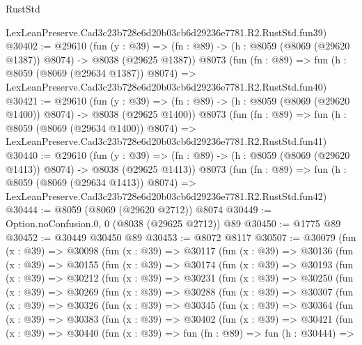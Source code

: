 \begin{lexlean}{RustStd}
\begin{coremodule}
    LexLeanPreserve.Cad3c23b728e6d20b03cb6d29236e7781.R2.RustStd.fun39)
@30402 := @29610
    (fun (y : @39) =>
    (fn : @89) -> (h : @8059 (@8069 (@29620 @1387)) @8074) -> @8038 (@29625 @1387))
    @8073
    (fun (fn : @89) =>
    fun (h : @8059 (@8069 (@29634 @1387)) @8074) =>
    LexLeanPreserve.Cad3c23b728e6d20b03cb6d29236e7781.R2.RustStd.fun40)
@30421 := @29610
    (fun (y : @39) =>
    (fn : @89) -> (h : @8059 (@8069 (@29620 @1400)) @8074) -> @8038 (@29625 @1400))
    @8073
    (fun (fn : @89) =>
    fun (h : @8059 (@8069 (@29634 @1400)) @8074) =>
    LexLeanPreserve.Cad3c23b728e6d20b03cb6d29236e7781.R2.RustStd.fun41)
@30440 := @29610
    (fun (y : @39) =>
    (fn : @89) -> (h : @8059 (@8069 (@29620 @1413)) @8074) -> @8038 (@29625 @1413))
    @8073
    (fun (fn : @89) =>
    fun (h : @8059 (@8069 (@29634 @1413)) @8074) =>
    LexLeanPreserve.Cad3c23b728e6d20b03cb6d29236e7781.R2.RustStd.fun42)
@30444 := @8059 (@8069 (@29620 @2712)) @8074
@30449 := Option.noConfusion.{0, 0} (@8038 (@29625 @2712)) @89
@30450 := @1775 @89
@30452 := @30449 @30450 @89
@30453 := @8072 @8117
@30507 := @30079
    (fun (x : @39) =>
    @30098
      (fun (x : @39) =>
      @30117
        (fun (x : @39) =>
        @30136
          (fun (x : @39) =>
          @30155
            (fun (x : @39) =>
            @30174
              (fun (x : @39) =>
              @30193
                (fun (x : @39) =>
                @30212
                  (fun (x : @39) =>
                  @30231
                    (fun (x : @39) =>
                    @30250
                      (fun (x : @39) =>
                      @30269
                        (fun (x : @39) =>
                        @30288
                          (fun (x : @39) =>
                          @30307
                            (fun (x : @39) =>
                            @30326
                              (fun (x : @39) =>
                              @30345
                                (fun (x : @39) =>
                                @30364
                                  (fun (x : @39) =>
                                  @30383
                                    (fun (x : @39) =>
                                    @30402
                                      (fun (x : @39) =>
                                      @30421
                                        (fun (x : @39) =>
                                        @30440
                                          (fun (x : @39) =>
                                          fun (fn : @89) =>
                                          fun (h : @30444) =>

\end{coremodule}
\end{lexlean}
